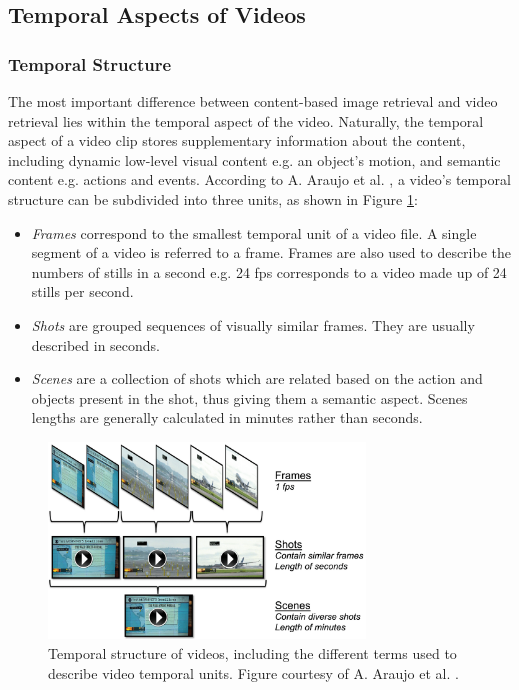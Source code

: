\documentclass[11pt,openany,a4paper]{article}
\begin{document}

\subsection{Temporal Aspects of Videos}
\label{sec:temporal-aspect-videos}

\subsubsection{Temporal Structure}

The most important difference between content-based image retrieval and video retrieval lies within the temporal aspect of the video. Naturally, the temporal aspect of a video clip stores supplementary information about the content, including dynamic low-level visual content e.g. an object's motion, and semantic content e.g. actions and events. According to A. Araujo et al. \cite{araujo2017i2v}, a video's temporal structure can be subdivided into three units, as shown in Figure \ref{fig:temporal_structure}:
\begin{itemize}
    \item \textit{Frames} correspond to the smallest temporal unit of a video file. A single segment of a video is referred to a frame. Frames are also used to describe the numbers of stills in a second e.g. 24 fps corresponds to a video made up of 24 stills per second.
    \item \textit{Shots} are grouped sequences of visually similar frames. They are usually described  in seconds.
    \item \textit{Scenes} are a collection of shots which are related based on the action and objects present in the shot, thus giving them a semantic aspect. Scenes lengths are generally calculated in minutes rather than seconds. 
\end{itemize}

\begin{figure}[h]
\centerline{\includegraphics[width=0.75\textwidth]{figures/temporal_structure_videos.png}}
\caption{\label{fig:temporal_structure}Temporal structure of videos, including the different terms used to describe video temporal units. Figure courtesy of A. Araujo et al. \cite{araujo2017i2v}.}
\end{figure}
\end{document}
